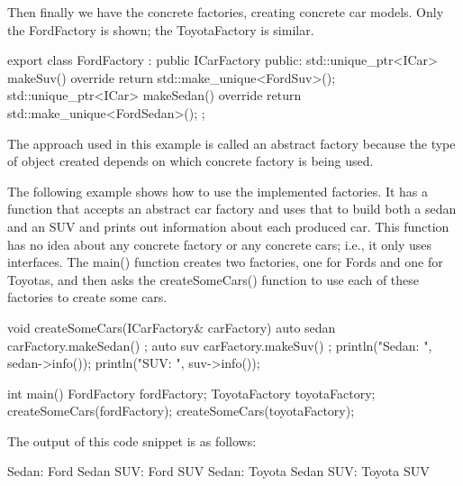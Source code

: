 Then finally we have the concrete factories, creating concrete car models. Only the FordFactory is shown; the ToyotaFactory is similar.

\begin{cpp}
export class FordFactory : public ICarFactory
{
    public:
        std::unique_ptr<ICar> makeSuv() override {
            return std::make_unique<FordSuv>(); }
        std::unique_ptr<ICar> makeSedan() override {
            return std::make_unique<FordSedan>(); }
};
\end{cpp}

The approach used in this example is called an abstract factory because the type of object created depends on which concrete factory is being used.


The following example shows how to use the implemented factories. It has a function that accepts an abstract car factory and uses that to build both a sedan and an SUV and prints out information about each produced car. This function has no idea about any concrete factory or any concrete cars; i.e., it only uses interfaces. The main() function creates two factories, one for Fords and one for Toyotas, and then asks the createSomeCars() function to use each of these factories to create some cars.

\begin{cpp}
void createSomeCars(ICarFactory& carFactory)
{
    auto sedan { carFactory.makeSedan() };
    auto suv { carFactory.makeSuv() };
    println("Sedan: {}", sedan->info());
    println("SUV: {}", suv->info());
}

int main()
{
    FordFactory fordFactory;
    ToyotaFactory toyotaFactory;
    createSomeCars(fordFactory);
    createSomeCars(toyotaFactory);
}
\end{cpp}

The output of this code snippet is as follows:

\begin{shell}
Sedan: Ford Sedan
SUV: Ford SUV
Sedan: Toyota Sedan
SUV: Toyota SUV
\end{shell}















